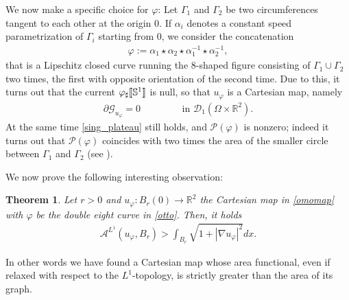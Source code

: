 \documentclass[a4paper,11pt]{article}
\numberwithin{equation}{section}
\newtheorem{theorem}{Theorem}[section]
\newcommand{\jump}[1]{\text{{\rm \textlbrackdbl}}{#1}\text{{\rm \textrbrackdbl}}}
\newcommand{\Om}{\Omega}
\newcommand{\R}{\mathbb{R}}
\begin{document}
We now make a specific choice for $\varphi$: Let $\Gamma_1$ and $\Gamma_2$ be two circumferences tangent to each other at the origin $0$. If $\alpha_i$ denotes a constant speed parametrization of $\Gamma_i$ starting from $0$, we consider the concatenation 
\begin{align}\label{otto}
\varphi:=\alpha_1\star \alpha_2\star \alpha_1^{-1}\star \alpha_2^{-1},
\end{align}
that is a Lipschitz closed curve running the $8$-shaped  figure consisting of $\Gamma_1\cup \Gamma_2$ two times, the first with opposite orientation of the second time. Due to this, it turns out that the current $\varphi_\sharp\jump{\mathbb S^1}$ is null, so that $u_\varphi$ is a Cartesian map, namely
\begin{align*}
	\partial \mathcal G_{u_\varphi}=0\qquad \qquad \text{ in }\mathcal D_1(\Om\times\R^2).
\end{align*}
At the same time \eqref{sing_plateau} still holds, and $\mathcal P(\varphi)$ is nonzero; indeed it turns out that  $\mathcal P(\varphi)$ coincides with two times the area of the smaller circle between $\Gamma_1$ and $\Gamma_2$ (see \cite{Paol,CS}).

We now prove the following interesting observation:

\begin{theorem}\label{teo_main2}
Let $r>0$ and $u_\varphi:B_r(0)\rightarrow\R^2$ the Cartesian map in \eqref{omomap} with $\varphi$ be the double eight curve in \eqref{otto}. Then, it holds
\begin{align}
\mathcal A^{L^1}(u_\varphi,B_r)>\int_{B_r} \sqrt{1+|\nabla u_\varphi|^2}dx.
\end{align}
\end{theorem}
 In other words we have found a Cartesian map whose area functional, even if relaxed with respect to the $L^1$-topology, is strictly greater than the area of its graph.
 
\end{document}

